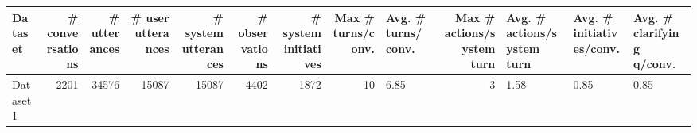 \begin{tabular}{lrrrrrrrlrlll}
\toprule
Dataset & # conversations & # utterances & # user utterances & # system utterances & # observations & # system initiatives & Max # turns/conv. & Avg. # turns/conv. & Max # actions/system turn & Avg. # actions/system turn & Avg. # initiatives/conv. & Avg. # clarifying q/conv. \\
\midrule
Dataset1 & 2201 & 34576 & 15087 & 15087 & 4402 & 1872 & 10 & 6.85 & 3 & 1.58 & 0.85 & 0.85 \\
\bottomrule
\end{tabular}
